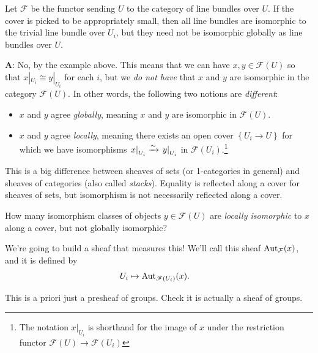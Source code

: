 \documentclass[11pt,openany]{book}
\begin{document}
\begin{example} Let $\mathcal{F}$ be the functor sending $U$ to the category of line bundles over $U$. If the cover is picked to be appropriately small, then all line bundles are isomorphic to the trivial line bundle over $U_i$, but they need not be isomorphic globally as line bundles over $U$.
\end{example}

\textbf{A}: No, by the example above. This means that we can have $x,y \in \mathcal{F}(U)$ so that $x|_{U_i} \cong y|_{U_i}$ for each $i$, but we \textit{do not have} that $x$ and $y$ are isomorphic in the category $\mathcal{F}(U)$. In other words, the following two notions are \textit{different}:
\begin{itemize}
    \item $x$ and $y$ agree \textit{globally}, meaning $x$ and $y$ are isomorphic in $\mathscr{F}(U)$.
    \item  $x$ and $y$ agree \textit{locally}, meaning there exists an open cover $\left\{ U_i \to U \right\}$ for which we have isomorphisms $\left. x \right|_{ U_i } \xrightarrow{\sim} \left. y \right|_{ U_i }$ in $\mathcal{F}(U_i)$.\footnote{%
    The notation $x|_{U_i}$ is shorthand for the image of $x$ under the restriction functor $\mathcal{F}(U) \to \mathcal{F}(U_i)$
    }
\end{itemize}


\begin{remark} This is a big difference between sheaves of sets (or 1-categories in general) and sheaves of categories (also called \textit{stacks}). Equality is reflected along a cover for sheaves of sets, but isomorphism is not necessarily reflected along a cover.
\end{remark}

\begin{question} How many isomorphism classes of objects $y\in \mathcal{F}(U)$ are \textit{locally isomorphic} to $x$ along a cover, but not globally isomorphic?
\end{question}

We're going to build a sheaf that measures this! We'll call this sheaf $\mathrm{Aut}_{\mathcal{F}}(x)$, and it is defined by
\begin{equation}\label{eqn:autx-torsor}
\begin{aligned}
    U_i &\mapsto \mathrm{Aut}_{\mathscr{F}(U_i)}(x).
\end{aligned}
\end{equation}
\begin{exercise} This is a priori just a presheaf of groups. Check it is actually a sheaf of groups.
\end{exercise}
\end{document}
